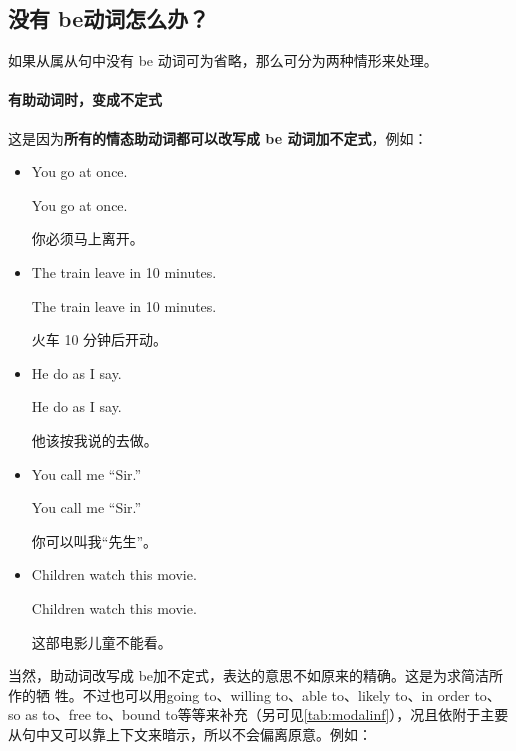 \subsection{没有 be动词怎么办？}

如果从属从句中没有 be 动词可为省略，那么可分为两种情形来处理。

\paragraph{有助动词时，变成不定式}

这是因为\textbf{所有的情态助动词都可以改写成 be 动词加不定式}，例如：
\begin{itemize}
\item   You  go at once.

  \reitem You  go at once.

  你必须马上离开。
\item The train  leave in 10 minutes.

\reitem The train  leave in 10 minutes.

火车 10 分钟后开动。

\item   He  do as I say.

  \reitem He  do as I say.

  他该按我说的去做。

\item   You  call me “Sir.”

  \reitem You  call me “Sir.”

  你可以叫我“先生”。

\item Children  watch this movie.

  \reitem Children  watch this movie.

  这部电影儿童不能看。
\end{itemize}

当然，助动词改写成 be加不定式，表达的意思不如原来的精确。这是为求简洁所作的牺
牲。不过也可以用going to、willing to、able to、likely to、in order to、so as
to、free to、bound to等等来补充（另可见\cref{tab:modalinf}），况且依附于主要
从句中又可以靠上下文来暗示，所以不会偏离原意。例如：

